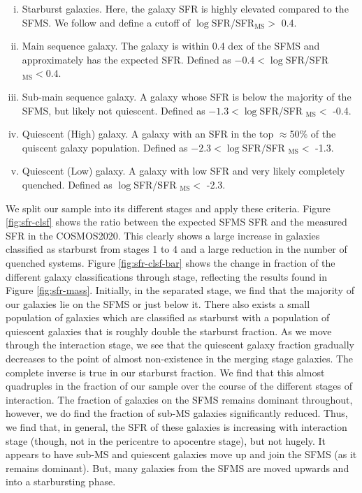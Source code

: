 \begin{enumerate}[(i)]
    \item Starburst galaxies. Here, the galaxy SFR is highly elevated compared to the SFMS. We follow \citet{2019MNRAS.484.4360A} and define a cutoff of $\log$SFR/SFR$_{\text{MS}} >$ 0.4.
    \item Main sequence galaxy. The galaxy is within 0.4 dex of the SFMS and approximately has the expected SFR. Defined as $-0.4 < \log$SFR/SFR$_{\text{MS}} < 0.4$.
    \item Sub-main sequence galaxy. A galaxy whose SFR is below the majority of the SFMS, but likely not quiescent. Defined as $-1.3 < \log$SFR/SFR $_{\text{MS}} < $ -0.4.
    \item Quiescent (High) galaxy. A galaxy with an SFR in the top $\approx$50\% of the quiscent galaxy population. Defined as $-2.3 < \log$SFR/SFR $_{\text{MS}} <$ -1.3.
    \item Quiescent (Low) galaxy. A galaxy with low SFR and very likely completely quenched. Defined as $\log$SFR/SFR $_{\text{MS}} <$ -2.3.
\end{enumerate}

\noindent We split our sample into its different stages and apply these criteria. Figure \ref{fig:sfr-clsf} shows the ratio between the expected SFMS SFR and the measured SFR in the COSMOS2020. This clearly shows a large increase in galaxies classified as starburst from stages 1 to 4 and a large reduction in the number of quenched systems. Figure \ref{fig:sfr-clsf-bar} shows the change in fraction of the different galaxy classifications through stage, reflecting the results found in Figure \ref{fig:sfr-mass}. Initially, in the separated stage, we find that the majority of our galaxies lie on the SFMS or just below it. There also exists a small population of galaxies which are classified as starburst with a population of quiescent galaxies that is roughly double the starburst fraction. As we move through the interaction stage, we see that the quiescent galaxy fraction gradually decreases to the point of almost non-existence in the merging stage galaxies. The complete inverse is true in our starburst fraction. We find that this almost quadruples in the fraction of our sample over the course of the different stages of interaction. The fraction of galaxies on the SFMS remains dominant throughout, however, we do find the fraction of sub-MS galaxies significantly reduced. Thus, we find that, in general, the SFR of these galaxies is increasing with interaction stage (though, not in the pericentre to apocentre stage), but not hugely. It appears to have sub-MS and quiescent galaxies move up and join the SFMS (as it remains dominant). But, many galaxies from the SFMS are moved upwards and into a starbursting phase.

